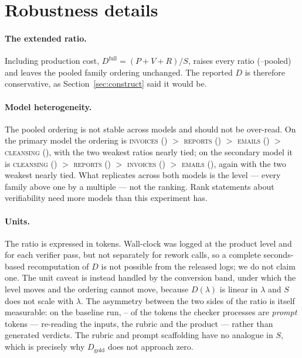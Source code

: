 \documentclass[11pt]{article}
\newcommand{\D}{\ensuremath{D}}
\newcommand{\SV}{\ensuremath{S}}
\newcommand{\VV}{\ensuremath{V}}
\newcommand{\RV}{\ensuremath{R}}
\newcommand{\famname}[1]{\textsc{#1}}
\begin{document}
\appendix

\section{Robustness details}
\label{app:robust}

\paragraph{The extended ratio.} Including production cost, $\D^{\text{full}}=(P+\VV+\RV)/\SV$,
raises every ratio (\VDdfullMin--\VDdfullMax pooled) and leaves the pooled family ordering unchanged. The
reported $\D$ is therefore conservative, as Section~\ref{sec:construct} said it would be.

\paragraph{Model heterogeneity.} The pooled ordering is not stable across models and should not
be over-read. On the primary model the ordering is \famname{invoices} (\VDqDInvoices) $>$
\famname{reports} (\VDqDReports) $>$ \famname{emails} (\VDqDEmails) $>$ \famname{cleansing} (\VDqDCleanse), with the two
weakest ratios nearly tied; on the secondary model it is \famname{cleansing} (\VDlDCleanse) $>$
\famname{reports} (\VDlDReports) $>$ \famname{invoices} (\VDlDInvoices) $>$ \famname{emails} (\VDlDEmails), again with the two
weakest nearly tied. What replicates across both models is the level --- every family above one by a
multiple --- not the ranking. Rank statements about verifiability need more models than this
experiment has.

\paragraph{Units.} The ratio is expressed in tokens. Wall-clock was logged at the product level
and for each verifier pass, but not separately for rework calls, so a complete seconds-based
recomputation of $\D$ is not possible from the released logs; we do not claim one. The unit caveat
is instead handled by the conversion band, under which the level moves and the ordering cannot
move, because $\D(\lambda)$ is linear in $\lambda$ and $\SV$ does not scale with $\lambda$. The
asymmetry between the two sides of the ratio is itself measurable: on the baseline run,
\VDpromptShareMin--\VDpromptShareMax{} of the tokens the checker processes are \emph{prompt} tokens
--- re-reading the inputs, the rubric and the product --- rather than generated verdicts. The rubric
and prompt scaffolding have no analogue in $\SV$, which is precisely why $\D_{\text{gold}}$ does not
approach zero.
\end{document}
